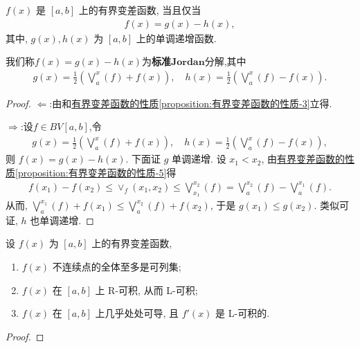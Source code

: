\documentclass[../../main.tex]{subfiles}%
\begin{document}
\begin{theorem}\label{theorem:实变函数--Jordan(约当)分解定理}
$f(x)$ 是 $[a,b]$ 上的有界变差函数, 当且仅当
\begin{align*}
f(x) = g(x) - h(x),
\end{align*}
其中, $g(x), h(x)$ 为 $[a,b]$ 上的单调递增函数.
\end{theorem}
\begin{remark}
我们称$f(x)=g(x)-h(x)$为\textbf{标准}$\mathbf{Jordan}$分解,其中
\begin{align*}
g(x) = \frac{1}{2}\left(\bigvee_a^x(f) + f(x)\right), \quad h(x) = \frac{1}{2}\left(\bigvee_a^x(f) - f(x)\right).
\end{align*}
\end{remark}
\begin{proof}

$\Longleftarrow$:由和\hyperref[proposition:有界变差函数的性质]{有界变差函数的性质\ref{proposition:有界变差函数的性质-3}}立得.

$\Longrightarrow$:设$f\in BV[a,b]$,令
\begin{align*}
g(x) = \frac{1}{2}\left(\bigvee_a^x(f) + f(x)\right), \quad h(x) = \frac{1}{2}\left(\bigvee_a^x(f) - f(x)\right),
\end{align*}
则 $f(x) = g(x) - h(x)$. 下面证 $g$ 单调递增. 设 $x_1 < x_2$, 由\hyperref[proposition:有界变差函数的性质]{有界变差函数的性质\ref{proposition:有界变差函数的性质-5}}得
\begin{align*}
f(x_1) - f(x_2) \leqslant \vee_f(x_1,x_2) \leqslant \bigvee_{x_1}^{x_2}(f) = \bigvee_a^{x_2}(f) - \bigvee_a^{x_1}(f).
\end{align*}
从而, $\bigvee_a^{x_1}(f) + f(x_1) \leqslant \bigvee_a^{x_2}(f) + f(x_2)$, 于是 $g(x_1) \leqslant g(x_2)$. 类似可证, $h$ 也单调递增.
\end{proof}

\begin{corollary}
设 $f(x)$ 为 $[a,b]$ 上的有界变差函数,
\begin{enumerate}[(1)]
\item $f(x)$ 不连续点的全体至多是可列集;
\item $f(x)$ 在 $[a,b]$ 上 R-可积, 从而 L-可积;
\item $f(x)$ 在 $[a,b]$ 上几乎处处可导, 且 $f'(x)$ 是 L-可积的.
\end{enumerate}
\end{corollary}
\begin{proof}

\end{proof}
\end{document}
